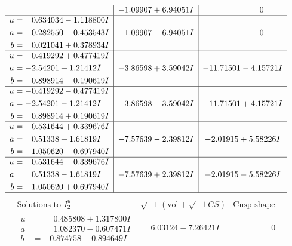 \documentclass[1p]{elsarticle_modified}
\theoremstyle{definition}
\newcommand{\I}{\sqrt{-1}}
\begin{document}
$$\begin{array}{c|c|c}
 & -1.09907 + 6.94051 I & \phantom{-0.000000 } 0 \\ \hline\begin{aligned}
u &= \phantom{-}0.634034 - 1.118800 I \\
a &= -0.282550 - 0.453543 I \\
b &= \phantom{-}0.021041 + 0.378934 I\end{aligned}
 & -1.09907 - 6.94051 I & \phantom{-0.000000 } 0 \\ \hline\begin{aligned}
u &= -0.419292 + 0.477419 I \\
a &= -2.54201 + 1.21412 I \\
b &= \phantom{-}0.898914 - 0.190619 I\end{aligned}
 & -3.86598 + 3.59042 I & -11.71501 - 4.15721 I \\ \hline\begin{aligned}
u &= -0.419292 - 0.477419 I \\
a &= -2.54201 - 1.21412 I \\
b &= \phantom{-}0.898914 + 0.190619 I\end{aligned}
 & -3.86598 - 3.59042 I & -11.71501 + 4.15721 I \\ \hline\begin{aligned}
u &= -0.531644 + 0.339676 I \\
a &= \phantom{-}0.51338 + 1.61819 I \\
b &= -1.050620 - 0.697940 I\end{aligned}
 & -7.57639 - 2.39812 I & -2.01915 + 5.58226 I \\ \hline\begin{aligned}
u &= -0.531644 - 0.339676 I \\
a &= \phantom{-}0.51338 - 1.61819 I \\
b &= -1.050620 + 0.697940 I\end{aligned}
 & -7.57639 + 2.39812 I & -2.01915 - 5.58226 I\\
 \hline 
 \end{array}$$\newpage$$\begin{array}{c|c|c}  
\text{Solutions to }I^u_{2}& \I (\text{vol} + \sqrt{-1}CS) & \text{Cusp shape}\\
 \hline 
\begin{aligned}
u &= \phantom{-}0.485808 + 1.317800 I \\
a &= \phantom{-}1.082370 - 0.607471 I \\
b &= -0.874758 - 0.894649 I\end{aligned}
 & \phantom{-}6.03124 - 7.26421 I & \phantom{-0.000000 } 0 \\ \hline\begin{aligned}

\end{aligned}
\end{array}$$
\end{document}
